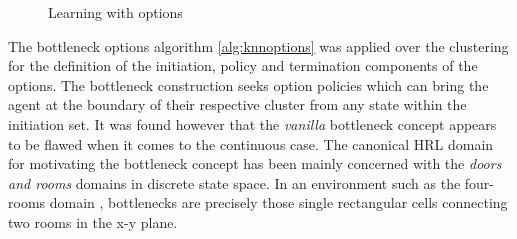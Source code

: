 \begin{figure}
\centering
{}\hspace{2mm}%
\caption{Learning with options}
\end{figure}

The bottleneck options algorithm \ref{alg:knnoptions} was applied over the clustering for the definition of the initiation, policy and termination components of the options. The bottleneck construction seeks option policies which can bring the agent at the boundary of their respective cluster from any state within the initiation set. It was found however that the \textit{vanilla} bottleneck concept appears to be flawed when it comes to the continuous case. The canonical HRL domain for motivating the bottleneck concept has been mainly concerned with the \textit{doors and rooms} domains in discrete state space. In an environment such as the four-rooms domain \parencite{Sutton1999}, bottlenecks are precisely those single rectangular cells connecting two rooms in the x-y plane. 

